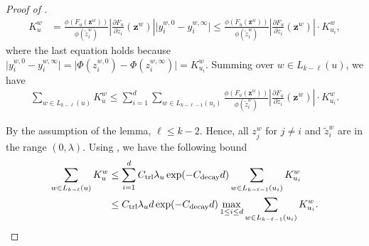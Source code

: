 \documentclass[11pt]{amsart}
\theoremstyle{definition}
\theoremstyle{remark}
\begin{document}
\begin{proof}[Proof of ]
\begin{align}\label{eq:K-u-w-potential-pf}
K_u^w &= \frac{ \phi(F_u(\boldsymbol{z}^w))}{\phi(\tilde{z}_i^w)} \left | \frac{\partial F_u}{\partial z_i}(\boldsymbol{z}^w) \right |  \bigl| y_i^{w,0} - y_i^{w,\infty} \bigr|\leq \frac{\phi(F_u(\boldsymbol{z}^w))}{\phi(\tilde{z}_i^w)} \left | \frac{\partial F_u}{\partial z_i}(\boldsymbol{z}^w) \right | \cdot K_{u_i}^w,
\end{align}
where the last equation holds because $\bigl| y_i^{w,0} - y_i^{w,\infty} \bigr| = \bigl| \Phi(z_i^{w,0}) - \Phi(z_i^{w,\infty}) \bigr| = K_{u_i}^w$.
Summing over $w \in L_{k-\ell}(u)$, we have
\begin{align}\label{eq:sum-K-u}
\sum_{w \in L_{k-\ell}(u)} K_u^w \leq \sum_{i=1}^d \sum_{w \in L_{k-\ell-1}(u_i)} \frac{\phi(F_u(\boldsymbol{z}^w))}{\phi(\tilde{z}_i^w)} \left | \frac{\partial F_u}{\partial z_i}(\boldsymbol{z}^w) \right | \cdot K_{u_i}^w.
\end{align}

By the assumption of the lemma, $\ell \leq k - 2$. Hence, all $z_j^w$ for $j \neq i$ and $\tilde{z}_i^w$ are in the range $(0,\lambda)$. Using , we have the following bound 
\begin{align*}
    \sum_{w \in L_{k-\ell}(u)} K_u^w  &\leq \sum_{i=1}^d C_\text{trl} \lambda_u \exp(-C_{\text{decay}} d)  \sum_{w \in L_{k-\ell-1}(u_i)} K_{u_i}^w\\
    &\leq C_\text{trl} \lambda_u d \exp(-C_{\text{decay}} d) \max_{1 \leq i \leq d} \sum_{w \in L_{k-\ell-1}(u_i)} K_{u_i}^w. \qedhere
\end{align*}
\end{proof}
\end{document}

